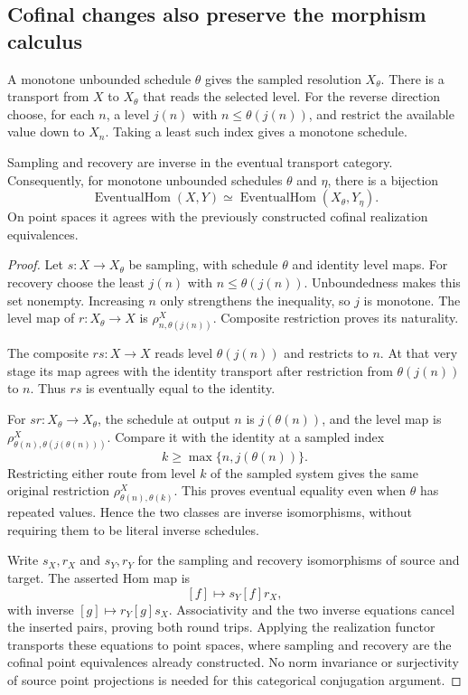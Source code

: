 \subsection{Cofinal changes also preserve the morphism calculus}
A monotone unbounded schedule \(\theta\) gives the sampled resolution \(X_\theta\). There is a transport from \(X\) to \(X_\theta\) that reads the selected level. For the reverse direction choose, for each \(n\), a level \(j(n)\) with \(n\le\theta(j(n))\), and restrict the available value down to \(X_n\). Taking a least such index gives a monotone schedule.

\begin{theorem}\label{KS64}
Sampling and recovery are inverse in the eventual transport category. Consequently, for monotone unbounded schedules \(\theta\) and \(\eta\), there is a bijection
\[
 \operatorname{EventualHom}(X,Y)
 \simeq
 \operatorname{EventualHom}(X_\theta,Y_\eta).
\]
On point spaces it agrees with the previously constructed cofinal realization equivalences.
\end{theorem}
\begin{proof}
Let \(s:X\to X_\theta\) be sampling, with schedule \(\theta\) and identity level maps. For recovery choose the least \(j(n)\) with \(n\le\theta(j(n))\). Unboundedness makes this set nonempty. Increasing \(n\) only strengthens the inequality, so \(j\) is monotone. The level map of \(r:X_\theta\to X\) is \(\rho^X_{n,\theta(j(n))}\). Composite restriction proves its naturality.

The composite \(rs:X\to X\) reads level \(\theta(j(n))\) and restricts to \(n\). At that very stage its map agrees with the identity transport after restriction from \(\theta(j(n))\) to \(n\). Thus \(rs\) is eventually equal to the identity.

For \(sr:X_\theta\to X_\theta\), the schedule at output \(n\) is \(j(\theta(n))\), and the level map is \(\rho^X_{\theta(n),\theta(j(\theta(n)))}\). Compare it with the identity at a sampled index
\[
 k\ge\max\{n,j(\theta(n))\}.
\]
Restricting either route from level \(k\) of the sampled system gives the same original restriction \(\rho^X_{\theta(n),\theta(k)}\). This proves eventual equality even when \(\theta\) has repeated values. Hence the two classes are inverse isomorphisms, without requiring them to be literal inverse schedules.

Write \(s_X,r_X\) and \(s_Y,r_Y\) for the sampling and recovery isomorphisms of source and target. The asserted Hom map is
\[
 [f]\longmapsto s_Y[f]r_X,
\]
with inverse \([g]\mapsto r_Y[g]s_X\). Associativity and the two inverse equations cancel the inserted pairs, proving both round trips. Applying the realization functor transports these equations to point spaces, where sampling and recovery are the cofinal point equivalences already constructed. No norm invariance or surjectivity of source point projections is needed for this categorical conjugation argument.
\end{proof}
